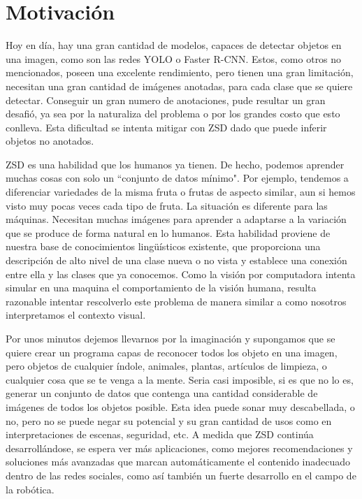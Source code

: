 \section{Motivación} \label{sec:motivacion}

Hoy en día, hay una gran cantidad de modelos, capaces de detectar objetos en una imagen, como son las redes YOLO o Faster R-CNN. Estos, como otros no mencionados, poseen una excelente rendimiento, pero tienen una gran limitación, necesitan una gran cantidad de imágenes anotadas, para cada clase que se quiere detectar. Conseguir un gran numero de anotaciones, pude resultar un gran desafió, ya sea por la naturaliza del problema o por los grandes costo que esto conlleva. Esta dificultad se intenta mitigar con ZSD dado que puede inferir objetos no anotados.

ZSD es una habilidad que los humanos ya tienen. De hecho, podemos aprender muchas cosas con solo un ``conjunto de datos mínimo". Por ejemplo, tendemos a diferenciar  variedades de la misma fruta o frutas de aspecto similar, aun si hemos visto muy pocas veces cada tipo de fruta. La situación es diferente para las máquinas. Necesitan muchas imágenes para aprender a adaptarse a la variación que se produce de forma natural en lo humanos. Esta habilidad proviene de nuestra base de conocimientos lingüísticos existente, que proporciona una descripción de alto nivel de una clase nueva o no vista y establece una conexión entre ella y las clases que ya conocemos. Como la visión por computadora intenta simular en una maquina el comportamiento de la visión humana, resulta razonable intentar rescolverlo este problema de manera similar a como nosotros interpretamos el contexto visual.

Por unos minutos dejemos llevarnos por la imaginación y supongamos que se quiere crear un programa capas de reconocer todos los objeto en una imagen, pero objetos de cualquier índole, animales, plantas, artículos de limpieza, o cualquier cosa que se te venga a la mente. Seria casi imposible, si es que no lo es, generar un conjunto de datos que contenga una cantidad considerable de imágenes de todos los objetos posible. Esta idea puede sonar muy descabellada, o no, pero no se puede negar su potencial y su gran cantidad de usos como en interpretaciones de escenas, seguridad, etc. A medida que ZSD continúa desarrollándose, se espera ver más aplicaciones, como mejores recomendaciones y soluciones más avanzadas que marcan automáticamente el contenido inadecuado dentro de las redes sociales, como así también un fuerte desarrollo en el campo de la robótica.

